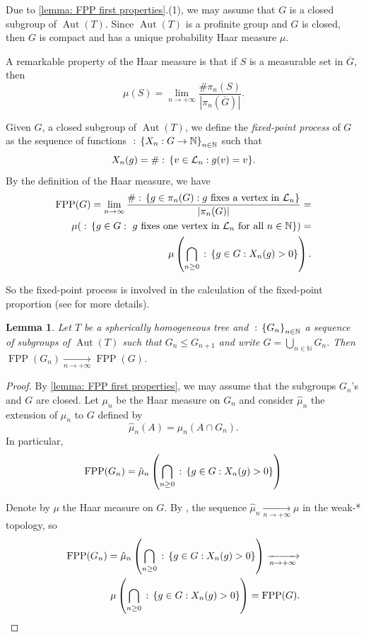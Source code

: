 \documentclass{amsart}
\def\set#1{{\def\st{\;:\;}\left\{#1\right\}}}
\def\abs#1{\left\vert{#1}\right\vert}
\def\NN{\mathbb N}
\DeclareMathOperator{\Aut}{Aut}
\DeclareMathOperator{\FPP}{FPP}
\DeclareMathOperator{\st}{st}
\newtheorem{Lemma}[Proposition]{Lemma}
\begin{document}
Due to \cref{lemma: FPP first properties}.(1), we may assume that $G$ is a closed subgroup of $\Aut(T)$. Since $\Aut(T)$ is a profinite group and $G$ is closed, then $G$ is compact and has a unique probability Haar measure $\mu$.

A remarkable property of the Haar measure is that if $S$ is a measurable set in $\overline{G}$, then \begin{equation} \mu(S) = \lim_{n \to +\infty} \frac{\# \pi_n(S)}{\abs{\pi_n(\overline{G})}}. \label{equation: Haar measure limit}
\end{equation}

Given $G$, a closed subgroup of $\Aut(T)$, we define the \textit{fixed-point process} of $G$ as the sequence of functions $\set{X_n: G \rightarrow \NN}_{n \in \NN}$ such that $$X_n(g) = \#\set{v \in \mathcal{L}_n: g(v) = v}.$$ By the definition of the Haar measure, we have
\begin{align}
\begin{split}
\FPP(G) = \lim_{n \rightarrow \infty} \frac{\# \set{g \in \pi_n(G): \text{$g$ fixes a vertex in $\mathcal{L}_n$}}}{\abs{\pi_n(G)}} = \\ \mu(\set{g \in G: \text{ $g$ fixes one vertex in $\mathcal{L}_n$ for all $n \in \NN$}}) = \\ \mu \left(\bigcap_{n \geq 0} \set{g \in G: X_n(g) > 0} \right).
\end{split}
\label{equation: FPP with Haar meaure}
\end{align}

So the fixed-point process is involved in the calculation of the fixed-point proportion (see \cite{Jones2014} for more details). 

\begin{Lemma}
Let $T$ be a spherically homogeneous tree and $\set{G_n}_{n \in \NN}$ a sequence of subgroups of $\Aut(T)$ such that $G_n \leq G_{n+1}$ and write $G = \bigcup_{n \in \NN} G_n$. Then $\FPP(G_n) \xrightarrow[n \rightarrow +\infty]{} \FPP(G)$.
\label{lemma: continuity FPP}
\end{Lemma}

\begin{proof}
By \cref{lemma: FPP first properties}, we may assume that the subgroups $G_n$'s and $G$ are closed. Let $\mu_n$ be the Haar measure on $G_n$ and consider $\hat{\mu}_n$ the extension of $\mu_n$ to $G$ defined by $$\hat{\mu}_n(A) = \mu_n(A \cap G_n).$$ In particular, $$\FPP(G_n) = \hat{\mu}_n \left(\bigcap_{n \geq 0} \set{g \in G: X_n(g) > 0} \right)$$

Denote by $\mu$ the Haar measure on $G$. By \cite[Exercise 4, Chapter VII]{Katznelson1968}, the sequence $\hat{\mu}_n \xrightarrow[n \rightarrow +\infty]{} \mu$ in the weak-* topology, so 
\begin{align*}
\FPP(G_n) = \hat{\mu}_n \left(\bigcap_{n \geq 0} \set{g \in G: X_n(g) > 0} \right) \xrightarrow[n \rightarrow +\infty]{} \\ \mu \left(\bigcap_{n \geq 0} \set{g \in G: X_n(g) > 0} \right) = \FPP(G).  
\end{align*}
\end{proof}
\end{document}
